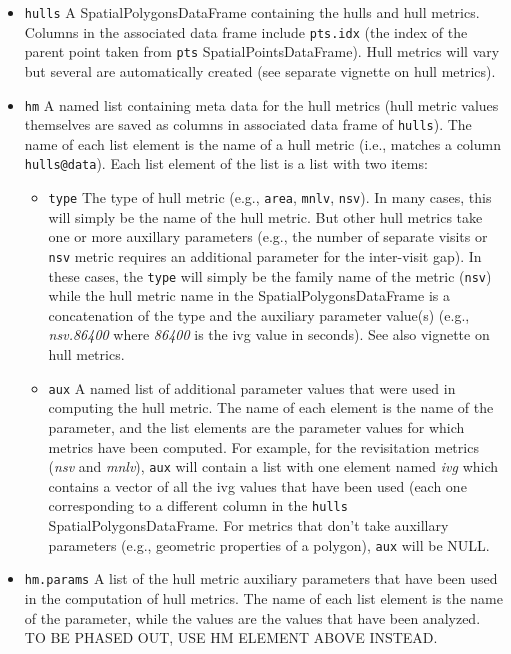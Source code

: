 \documentclass{article}
\begin{document}
\begin{itemize}
  \item \texttt{hulls} A SpatialPolygonsDataFrame containing the hulls and hull metrics. Columns in the associated data frame include \texttt{pts.idx} (the index of the parent point taken from \texttt{pts} SpatialPointsDataFrame). Hull metrics will vary but several are automatically created (see separate vignette on hull metrics).
  \item \texttt{hm} A named list containing meta data for the hull metrics (hull metric values themselves are saved as columns in associated data frame of \texttt{hulls}). The name of each list element is the name of a hull metric (i.e., matches a column \texttt{hulls@data}). Each list element of the list is a list with two items:
    \begin{itemize}  
      \item \texttt{type} The type of hull metric (e.g., \texttt{area}, \texttt{mnlv}, \texttt{nsv}). In many cases, this will simply be the name of the hull metric. But other hull metrics take one or more auxillary parameters (e.g., the number of separate visits or \texttt{nsv} metric requires an additional parameter for the inter-visit gap). In these cases, the \texttt{type} will simply be the family name of the metric (\texttt{nsv}) while the hull metric name in the SpatialPolygonsDataFrame is a concatenation of the type and the auxiliary parameter value(s) (e.g., \textit{nsv.86400} where \textit{86400} is the ivg value in seconds). See also vignette on hull metrics.
      \item \texttt{aux} A named list of additional parameter values that were used in computing the hull metric. The name of each element is the name of the parameter, and the list elements are the parameter values for which metrics have been computed. For example, for the revisitation metrics (\textit{nsv} and \textit{mnlv}), \texttt{aux} will contain a list with one element named \textit{ivg} which contains a vector of all the ivg values that have been used (each one corresponding to a different column in the \texttt{hulls} SpatialPolygonsDataFrame. For metrics that don't take auxillary parameters (e.g., geometric properties of a polygon), \texttt{aux} will be NULL.
    \end{itemize}  

  \item \texttt{hm.params} A list of the hull metric auxiliary parameters that have been used in the computation of hull metrics. The name of each list element is the name of the parameter, while the values are the values that have been analyzed. TO BE PHASED OUT, USE HM ELEMENT ABOVE INSTEAD.


\end{itemize}
\end{document}
